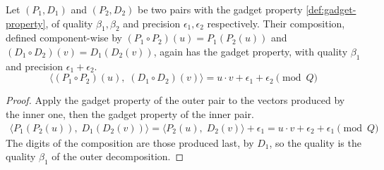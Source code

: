 


\begin{lemma}
    \label{thm:gadget-layers}
    Let $(P_1, D_1)$ and $(P_2, D_2)$ be two pairs with the gadget property \eqref{def:gadget-property}, of quality $\beta_1, \beta_2$ and precision $\epsilon_1, \epsilon_2$ respectively. Their composition, defined component-wise by $(P_1\circ P_2)(u) = P_1(P_2(u))$ and $(D_1\circ D_2)(v) = D_1(D_2(v))$, again has the gadget property, with quality $\beta_1$ and precision $\epsilon_1 + \epsilon_2$.
    \begin{equation}
        \label{eq:gadget-layers}
        \langle (P_1\circ P_2)(u),\; (D_1\circ D_2)(v)\rangle = u\cdot v + \epsilon_1 + \epsilon_2 \pmod{Q}
    \end{equation}

    \begin{proof}
        Apply the gadget property of the outer pair to the vectors produced by the inner one, then the gadget property of the inner pair.
        \begin{gather*}
            \langle P_1(P_2(u)),\; D_1(D_2(v)) \rangle = \langle P_2(u),\; D_2(v)\rangle + \epsilon_1 = u\cdot v + \epsilon_2 + \epsilon_1 \pmod{Q}
        \end{gather*}
        The digits of the composition are those produced last, by $D_1$, so the quality is the quality $\beta_1$ of the outer decomposition.
    \end{proof}
\end{lemma}


